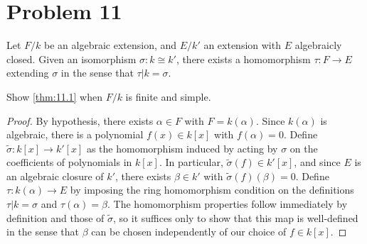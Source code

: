 \documentclass[11pt, letterpaper]{article}
\begin{document}
\section{Problem 11}
\begin{theorem}\label{thm:11.1}
	Let $F/k$ be an algebraic extension, and $E/k'$ an extension with $E$ algebraicly closed. Given an isomorphism $\sigma : k \cong k'$, there exists a homomorphism $\tau : F \to E$ extending $\sigma $ in the sense that $\tau |k=\sigma $.
\end{theorem}
\begin{problem}\label{11.1}
	Show \cref{thm:11.1} when $F/k$ is finite and simple.
\end{problem}
\begin{proof}
	By hypothesis, there exists $\alpha \in F$ with $F=k(\alpha )$. Since $k(\alpha )$ is algebraic, there is a polynomial $f(x)\in k[x]$ with $f(\alpha )=0$. Define $\widetilde{\sigma } : k[x] \to k'[x]$ as the homomorphism induced by acting by $\sigma $ on the coefficients of polynomials in $k[x]$. In particular, $\widetilde{\sigma } (f)\in k'[x]$, and since $E$ is an algebraic closure of $k'$, there exists $\beta \in k'$ with $\widetilde{\sigma } (f)(\beta )=0$. Define $\tau : k(\alpha ) \to E$ by imposing the ring homomorphism condition on the definitions $\tau |k=\sigma $ and $\tau (\alpha )=\beta $. The homomorphism properties follow immediately by definition and those of $\widetilde{\sigma } $, so it suffices only to show that this map is well-defined in the sense that $\beta $ can be chosen independently of our choice of $f\in k[x]$.


\end{proof}
\end{document}
